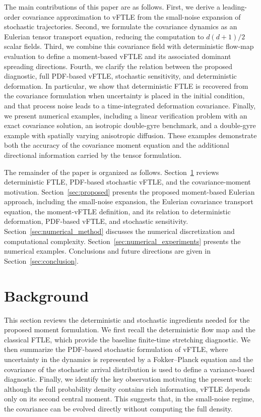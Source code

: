 \documentclass[a4paper,11pt]{article}
\numberwithin{equation}{section}
\theoremstyle{plain}
\theoremstyle{definition}
\theoremstyle{remark}
\begin{document}
The main contributions of this paper are as follows.  First, we derive a leading-order covariance approximation to vFTLE from the small-noise expansion of stochastic trajectories.  Second, we formulate the covariance dynamics as an Eulerian tensor transport equation, reducing the computation to \(d(d+1)/2\) scalar fields.  Third, we combine this covariance field with deterministic flow-map evaluation to define a moment-based vFTLE and its associated dominant spreading directions.  Fourth, we clarify the relation between the proposed diagnostic, full PDF-based vFTLE, stochastic sensitivity, and deterministic deformation.  In particular, we show that deterministic FTLE is recovered from the covariance formulation when uncertainty is placed in the initial condition, and that process noise leads to a time-integrated deformation covariance.  Finally, we present numerical examples, including a linear verification problem with an exact covariance solution, an isotropic double-gyre benchmark, and a double-gyre example with spatially varying anisotropic diffusion.  These examples demonstrate both the accuracy of the covariance moment equation and the additional directional information carried by the tensor formulation.

The remainder of the paper is organized as follows.  Section~\ref{sec:background} reviews deterministic FTLE, PDF-based stochastic vFTLE, and the covariance-moment motivation.  Section~\ref{sec:proposed} presents the proposed moment-based Eulerian approach, including the small-noise expansion, the Eulerian covariance transport equation, the moment-vFTLE definition, and its relation to deterministic deformation, PDF-based vFTLE, and stochastic sensitivity.  Section~\ref{sec:numerical_method} discusses the numerical discretization and computational complexity.  Section~\ref{sec:numerical_experiments} presents the numerical examples.  Conclusions and future directions are given in Section~\ref{sec:conclusion}.


\section{Background}
\label{sec:background}

This section reviews the deterministic and stochastic ingredients needed for the proposed moment formulation.  We first recall the deterministic flow map and the classical FTLE, which provide the baseline finite-time stretching diagnostic.  We then summarize the PDF-based stochastic formulation of vFTLE, where uncertainty in the dynamics is represented by a Fokker--Planck equation and the covariance of the stochastic arrival distribution is used to define a variance-based diagnostic.  Finally, we identify the key observation motivating the present work: although the full probability density contains rich information, vFTLE depends only on its second central moment.  This suggests that, in the small-noise regime, the covariance can be evolved directly without computing the full density.
\end{document}
